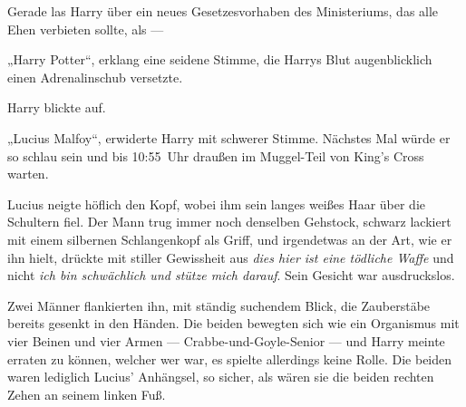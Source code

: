 Gerade las Harry über ein neues Gesetzesvorhaben des Ministeriums, das alle Ehen verbieten sollte, als —

„Harry Potter“, erklang eine seidene Stimme, die Harrys Blut augenblicklich einen Adrenalinschub versetzte.

Harry blickte auf.

„Lucius Malfoy“, erwiderte Harry mit schwerer Stimme. Nächstes Mal würde er so schlau sein und bis 10:55~Uhr draußen im Muggel-Teil von King’s Cross warten.

Lucius neigte höflich den Kopf, wobei ihm sein langes weißes Haar über die Schultern fiel. Der Mann trug immer noch denselben Gehstock, schwarz lackiert mit einem silbernen Schlangenkopf als Griff, und irgendetwas an der Art, wie er ihn hielt, drückte mit stiller Gewissheit aus \emph{dies hier ist eine tödliche Waffe} und nicht \emph{ich bin schwächlich und stütze mich darauf}. Sein Gesicht war ausdruckslos.

Zwei Männer flankierten ihn, mit ständig suchendem Blick, die Zauberstäbe bereits gesenkt in den Händen. Die beiden bewegten sich wie ein Organismus mit vier Beinen und vier Armen — Crabbe-und-Goyle-Senior — und Harry meinte erraten zu können, welcher wer war, es spielte allerdings keine Rolle. Die beiden waren lediglich Lucius’ Anhängsel, so sicher, als wären sie die beiden rechten Zehen an seinem linken Fuß.

